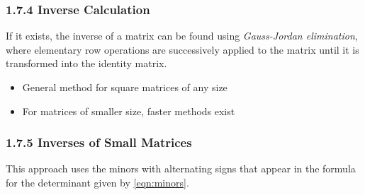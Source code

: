 \documentclass[11pt]{article}
\begin{document}
\subsubsection*{1.7.4 Inverse Calculation}
If it exists, the inverse of a matrix can be found using \textit{Gauss-Jordan elimination},
where elementary row operations are successively applied to the matrix until it
is transformed into the identity matrix.
\begin{itemize}
    \item General method for square matrices of any size
    \item For matrices of smaller size, faster methods exist
\end{itemize}

    \subsubsection*{1.7.5 Inverses of Small Matrices}
    This approach uses the minors with alternating signs that appear in the formula
    for the determinant given by \eqref{eqn:minors}.
\end{document}

